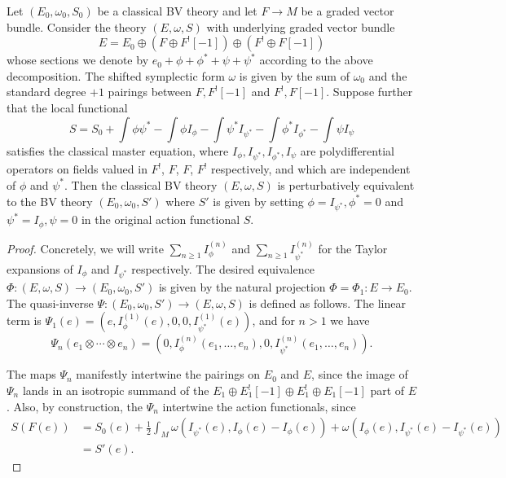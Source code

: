 \documentclass[10pt, oneside]{article}
\begin{document}
\begin{prop} 
\label{prop:BRSTdoublet}
Let $(E_0, \omega_0, S_0)$ be a classical BV theory and let $F \to M$ be a graded vector bundle.
Consider the theory $(E, \omega, S)$ with underlying graded vector bundle
\[
E = E_0 \oplus \left(F \oplus F^! [-1]\right) \oplus \left(F^! \oplus F[-1] \right)
\]
whose sections we denote by $e_0 + \phi + \phi^* + \psi + \psi^*$ according to the above decomposition. 
The shifted symplectic form $\omega$ is given by the sum of $\omega_0$ and the standard degree $+1$ pairings between $F, F^! [-1]$ and $F^!, F[-1]$. 
Suppose further that the local functional
\[
S = S_0 + \int \phi \psi^* - \int \phi I_\phi - \int \psi^* I_{\psi^*} - \int \phi^* I_{\phi^*} - \int \psi I_{\psi}
\]
satisfies the classical master equation, where $I_{\phi}, I_{\psi^*}, I_{\phi^*}, I_{\psi}$ are polydifferential operators on fields valued in $F^!$, $F$, $F$, $F^!$ respectively, and which are independent of $\phi$ and $\psi^*$.
Then the classical BV theory $(E, \omega, S)$ is perturbatively equivalent to the BV theory $(E_0, \omega_0, S')$ where $S'$ is given by setting $\phi = I_{\psi^*}, \phi^* = 0$ and $\psi^* = I_{\phi}, \psi = 0$ in the original action functional $S$. 
\end{prop}
\begin{proof}
Concretely, we will write $\sum_{n \ge 1} I^{(n)}_\phi$ and $\sum_{n \ge 1} I^{(n)}_{\psi^*}$ for the Taylor expansions of $I_\phi$ and $I_{\psi^*}$ respectively.  
The desired equivalence $\Phi \colon (E, \omega, S) \to (E_0, \omega_0, S')$ is given by the natural projection $\Phi = \Phi_1 \colon E \to E_0$. 
The quasi-inverse $\Psi \colon (E_0, \omega_0, S') \to (E, \omega, S)$ is defined as follows.
The linear term is $\Psi_1(e) = (e, I^{(1)}_{\phi}(e),0,0, I^{(1)}_{\psi^*}(e))$, and for $n > 1$ we have 
\[\Psi_n(e_1\otimes \cdots \otimes e_n) = (0, I^{(n)}_{\phi}(e_1, \ldots, e_n), 0, I^{(n)}_{\psi^*}(e_1, \ldots, e_n)).\]

The maps $\Psi_n$ manifestly intertwine the pairings on $E_0$ and $E$, since the image of $\Psi_n$ lands in an isotropic summand of the $E_1\oplus E_1^![-1]\oplus E_1^!\oplus E_1[-1]$ part of $E$.  
Also, by construction, the $\Psi_n$ intertwine the action functionals, since
\begin{align*}
S(F(e)) &= S_0(e) + \frac{1}{2} \int_M \omega(I_{\psi^*}(e), I_\phi(e) - I_\phi(e)) + \omega(I_\phi (e), I_{\psi^*}(e) - I_{\psi^*}(e)) \\
&= S'(e).
\end{align*}
\end{proof}
\end{document}
